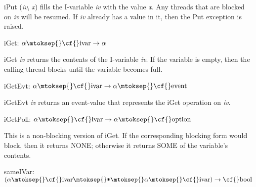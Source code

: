 \begin{descr}
\begin{speccomment}
\item {\cf \small i\-Put (\mbox{\cf \small \textit{iv}}, \mbox{\cf \small \textit{x}})           } 
fills the I-variable \mbox{\cf \small \textit{iv}} with the value \mbox{\cf \small \textit{x}}. 	  Any threads that are blocked on \mbox{\cf \small \textit{iv}} will be resumed. 	  If \mbox{\cf \small \textit{iv}} already has a value in it, then the {\cf \small Put} 	  exception is raised.     \end{speccomment}
\item {}{} {\cf iGet: \(\alpha\mtoksep{}\mbox{\cf{}ivar}\rightarrow \alpha\)}\label{val-SYNC_VAR.iGet}


\begin{speccomment}
\item {\cf \small i\-Get \mbox{\cf \small \textit{iv}}           } 
returns the contents of the I-variable \mbox{\cf \small \textit{iv}}. 	  If the variable is empty, then the calling thread blocks until 	  the variable becomes full.     \end{speccomment}
\item {}{} {\cf iGetEvt: \(\alpha\mtoksep{}\mbox{\cf{}ivar}\rightarrow \alpha\mtoksep{}\mbox{\cf{}event}\)}\label{val-SYNC_VAR.iGetEvt}


\begin{speccomment}
\item {\cf \small i\-Get\-Evt \mbox{\cf \small \textit{iv}}           } 
returns an event-value that represents the {\cf \small i\-Get} 	  operation on \mbox{\cf \small \textit{iv}}.     \end{speccomment}
\item {}{} {\cf iGetPoll: \(\alpha\mtoksep{}\mbox{\cf{}ivar}\rightarrow \alpha\mtoksep{}\mbox{\cf{}option}\)}\label{val-SYNC_VAR.iGetPoll}


\begin{speccomment}
\item 

	  This is a non-blocking version of {\cf \small i\-Get}. 	  If the corresponding blocking form would block, then it returns 	  {\cf \small NONE}; otherwise 	  it returns {\cf \small SOME} 	  of the variable's contents.     \end{speccomment}
\item {}{} {\cf sameIVar: \((\alpha\mtoksep{}\mbox{\cf{}ivar}\mtoksep{}\verb,*,\mtoksep{}\alpha\mtoksep{}\mbox{\cf{}ivar})\rightarrow \mbox{\cf{}bool}\)}\label{val-SYNC_VAR.sameIVar}



\end{descr}
